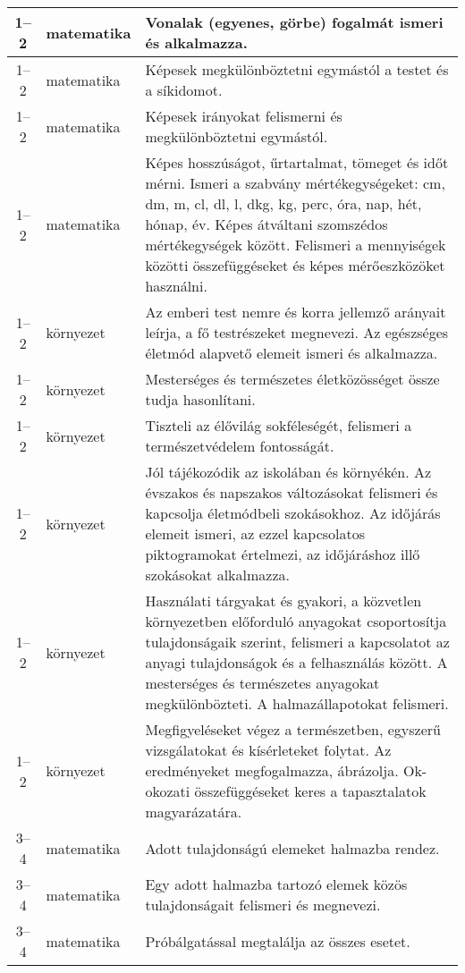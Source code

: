\begin{small}
\begin{longtable}{c | p{2cm} |  p{11cm} }
              1--2 & matematika & Vonalak (egyenes, görbe) fogalmát ismeri és alkalmazza. \\ \hline
              1--2 & matematika & Képesek megkülönböztetni egymástól a testet és a síkidomot. \\ \hline
              1--2 & matematika & Képesek irányokat felismerni és megkülönböztetni egymástól. \\ \hline
              1--2 & matematika & Képes hosszúságot, űrtartalmat, tömeget és időt mérni. Ismeri a szabvány mértékegységeket: cm, dm, m, cl, dl, l, dkg, kg, perc, óra, nap, hét, hónap, év. Képes átváltani szomszédos mértékegységek között. Felismeri a mennyiségek közötti összefüggéseket és képes mérőeszközöket használni. \\ \hline
              1--2 & környezet & Az emberi test nemre és korra jellemző arányait leírja, a fő testrészeket megnevezi. Az egészséges életmód alapvető elemeit ismeri és alkalmazza. \\ \hline
              1--2 & környezet & Mesterséges és természetes életközösséget össze tudja hasonlítani. \\ \hline
              1--2 & környezet & Tiszteli az élővilág sokféleségét, felismeri a természetvédelem fontosságát. \\ \hline
              1--2 & környezet & Jól tájékozódik az iskolában és környékén. Az évszakos és napszakos változásokat felismeri és kapcsolja életmódbeli szokásokhoz. Az időjárás elemeit ismeri, az ezzel kapcsolatos piktogramokat értelmezi, az időjáráshoz illő szokásokat alkalmazza. \\ \hline
              1--2 & környezet & Használati tárgyakat és gyakori, a közvetlen környezetben előforduló anyagokat csoportosítja tulajdonságaik szerint, felismeri a kapcsolatot az anyagi tulajdonságok és a felhasználás között. A mesterséges és természetes anyagokat megkülönbözteti. A halmazállapotokat felismeri. \\ \hline
              1--2 & környezet & Megfigyeléseket végez a természetben, egyszerű vizsgálatokat és kísérleteket  folytat. Az eredményeket megfogalmazza, ábrázolja. Ok-okozati összefüggéseket keres a tapasztalatok magyarázatára. \\ \hline
              3--4 & matematika & Adott tulajdonságú elemeket halmazba rendez. \\ \hline
              3--4 & matematika & Egy adott halmazba tartozó elemek közös tulajdonságait felismeri és megnevezi. \\ \hline
              3--4 & matematika & Próbálgatással megtalálja az összes esetet. \\ \hline

\end{longtable}
\end{small}
